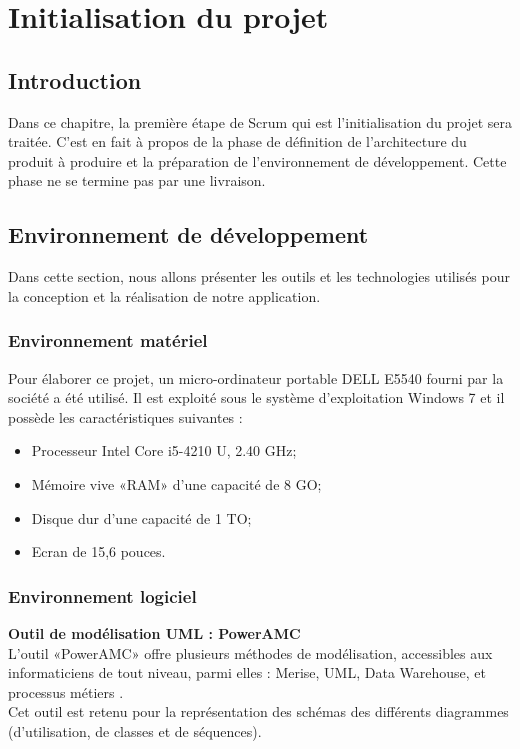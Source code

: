 
\chapter{Initialisation du projet}

\section*{Introduction}
Dans ce chapitre, la première étape de Scrum qui est l'initialisation du projet sera traitée. C'est en fait à propos de
la phase de définition de l'architecture du produit à produire et la préparation de l'environnement de développement. Cette phase ne se termine pas par une livraison.

\section{Environnement de développement}
Dans cette section, nous allons présenter les outils et les technologies utilisés pour la conception et la réalisation de notre application.
\subsection{Environnement matériel}
Pour élaborer ce projet, un micro-ordinateur portable DELL E5540 fourni par la société a été utilisé. Il est exploité sous le système d’exploitation Windows 7 et il possède les caractéristiques suivantes :
 \begin{itemize}
    \item Processeur Intel Core i5-4210 U, 2.40 GHz;
    \item Mémoire vive «RAM» d’une capacité de 8 GO;
    \item Disque dur d’une capacité de 1 TO;
    \item Ecran de 15,6 pouces.
    \end{itemize}
\subsection{Environnement logiciel}
\textbf{Outil de modélisation UML : PowerAMC }\\
L’outil «PowerAMC» offre plusieurs méthodes de modélisation, accessibles aux informaticiens de tout niveau, parmi elles : Merise, UML, Data Warehouse, et processus métiers \cite{PowerAmc}.\\
   Cet outil est retenu pour la représentation des schémas des différents diagrammes (d’utilisation, de classes et de séquences).

